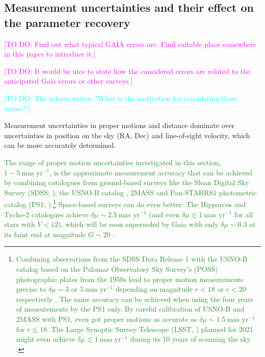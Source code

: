 \documentclass[iop,revtex4]{emulateapj}
\newcommand{\HW}[1]{\textcolor{Cyan}{#1}}
\newcommand{\NEW}[1]{\textcolor{ForestGreen}{#1}}
\newcommand{\Wilma}[1]{\textcolor{Magenta}{#1}}
\begin{document}
\subsection{Measurement uncertainties and their effect on the parameter recovery} \label{sec:results_errors}

\Wilma{[TO DO: Find out what typical GAIA errors are. Find suitable place somewhere in this paper to introduce it.]}

\Wilma{[TO DO: It would be nice to state how the considered errors are related to the anticipated Gaia errors or other surveys.]}

\HW{[TO DO: The referee writes: "What is the motivation for considering these errors?"]}

Measurement uncertainties in proper motions and distance dominate over uncertainties in position on the sky (RA, Dec) and line-of-sight velocity, which can be more accurately determined.

\NEW{The range of proper motion uncertainties investigated in this section, $1-5~\text{mas yr}^{-1}$, is the approximate measurement accuracy that can be achieved by combining catalogues from ground-based surveys like the  Sloan Digital Sky Survey (SDSS; \citealt{2003AJ....126.2081A}), the USNO-B catalog \citep{2003AJ....125..984M}, 2MASS \citep{2006AJ....131.1163S} and Pan-STARRS1 photometric catalog (PS1;  \citealt{2010SPIE.7733E..0EK}).}\footnote{\NEW{Combining observations from the SDSS Data Release 1 with the USNO-B catalog based on the Palomar Observatory Sky Survey's (POSS) photographic plates from the 1950s lead to proper motion measurements precise to $\delta\mu\sim3$ or $5~\text{mas yr}^{-1}$ depending on magnitude $r<18$ or $r<20$ respectively \citep{2004AJ....127.3034M,2008AJ....136..895M,2004ApJS..152..103G}. The same accuracy can be achieved when using the four years of measurements by the PS1 only. By careful calibration of USNO-B and 2MASS with PS1, \citet{2015ApJ...809...59S} even got proper motions as accurate as} \NEW{$\delta \mu\sim1.5~\text{mas yr}^{-1}$ for $r\lesssim 18$. The Large Synoptic Survey Telescope (LSST, \citealt{2008arXiv0805.2366I}) planned for 2021 might even achieve $\delta\mu \lesssim 1~\text{mas yr}^{-1}$ during its 10 years of scanning the sky \citep{2008IAUS..248..537I}.}} \NEW{Space-based surveys can do even better: The Hipparcos \citep{1997ESASP1200.....E} and Tycho-2 \citep{2000A&A...355L..27H} catalogues achieve $\delta \mu\sim2.5~\text{mas yr}^{-1}$ (and even $\delta\mu \lesssim 1 ~\text{mas yr}^{-1}$ for all stars with $V <12$), which will be soon superseded by Gaia with only $\delta \mu\sim0.3$ at its faint end at magnitude $G\sim20$ \citep{2014EAS....67...23D}.}
\end{document}
